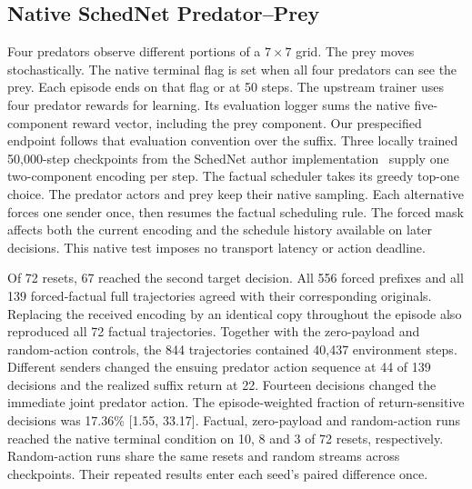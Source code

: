 \documentclass[pdflatex,sn-mathphys-num]{sn-jnl}
\begin{document}
\subsection{Native SchedNet Predator--Prey}
Four predators observe different portions of a $7\times7$ grid. The prey moves stochastically. The native terminal flag is set when all four predators can see the prey. Each episode ends on that flag or at 50 steps. The upstream trainer uses four predator rewards for learning. Its evaluation logger sums the native five-component reward vector, including the prey component. Our prespecified endpoint follows that evaluation convention over the suffix. Three locally trained 50,000-step checkpoints from the SchedNet author implementation~\citep{kim2019schedule} supply one two-component encoding per step. The factual scheduler takes its greedy top-one choice. The predator actors and prey keep their native sampling. Each alternative forces one sender once, then resumes the factual scheduling rule. The forced mask affects both the current encoding and the schedule history available on later decisions. This native test imposes no transport latency or action deadline.

Of 72 resets, 67 reached the second target decision. All 556 forced prefixes and all 139 forced-factual full trajectories agreed with their corresponding originals. Replacing the received encoding by an identical copy throughout the episode also reproduced all 72 factual trajectories. Together with the zero-payload and random-action controls, the 844 trajectories contained 40,437 environment steps. Different senders changed the ensuing predator action sequence at 44 of 139 decisions and the realized suffix return at 22. Fourteen decisions changed the immediate joint predator action. The episode-weighted fraction of return-sensitive decisions was 17.36\% [1.55, 33.17]. Factual, zero-payload and random-action runs reached the native terminal condition on 10, 8 and 3 of 72 resets, respectively. Random-action runs share the same resets and random streams across checkpoints. Their repeated results enter each seed's paired difference once.
\end{document}
